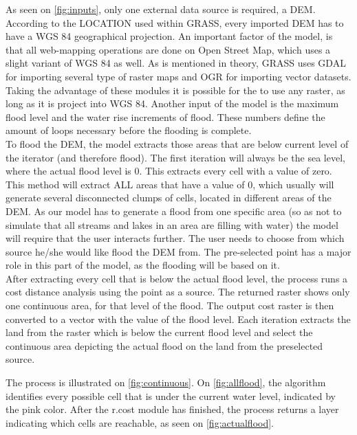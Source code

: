 As seen on \autoref{fig:inputs}, only one external data source is required, a DEM. According to the LOCATION used within GRASS, every imported DEM has to have a WGS 84 geographical projection. An important factor of the model, is that all web-mapping operations are done on Open Street Map, which uses a slight variant of WGS 84 as well. As is mentioned in theory, GRASS uses GDAL for importing several type of raster maps and OGR for importing vector datasets. Taking the advantage of these modules it is possible for the to use any raster, as long as it is project into WGS 84. Another input of the model is the maximum flood level and the water rise increments of flood. These numbers define the amount of loops necessary before the flooding is complete.\\
To flood the DEM, the model extracts those areas that are below current level of the iterator (and therefore flood). The first iteration will always be the sea level, where the actual flood level is 0. This extracts every cell with a value of zero. \\
This method will extract ALL areas that have a value of 0, which usually will generate several disconnected clumps of cells, located in different areas of the DEM. As our model has to generate a flood from one specific area (so as not to simulate that all streams and lakes in an area are filling with water) the model will require that the user interacts further. The user needs to choose from which source he/she would like flood the DEM from. The pre-selected point has a major role in this part of the model, as the flooding will be based on it. \\

After extracting every cell that is below the actual flood level, the process runs a cost distance analysis using the point as a source. The returned raster shows only one continuous area, for that level of the flood. The output cost raster is then converted to a vector with the value of the flood level. Each iteration extracts the land from the raster which is below the current flood level and select the continuous area depicting the actual flood on the land from the preselected source. 

The process is illustrated on \autoref{fig:continuous}. On \autoref{fig:allflood}, the algorithm identifies every possible cell that is under the current water level, indicated by the pink color. After the r.cost module has finished, the process returns a layer indicating which cells are reachable, as seen on \autoref{fig:actualflood}.\\

